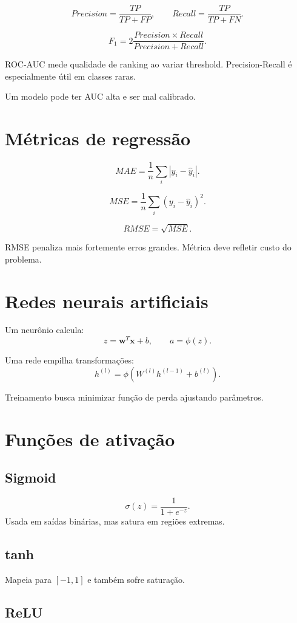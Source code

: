 \[
Precision=\frac{TP}{TP+FP},\qquad
Recall=\frac{TP}{TP+FN}.
\]

\[
F_1=2\frac{Precision\times Recall}{Precision+Recall}.
\]

ROC-AUC mede qualidade de ranking ao variar threshold. Precision-Recall é especialmente útil em classes raras.

Um modelo pode ter AUC alta e ser mal calibrado.

\section{Métricas de regressão}

\[
MAE=\frac{1}{n}\sum_i|y_i-\hat y_i|.
\]

\[
MSE=\frac{1}{n}\sum_i(y_i-\hat y_i)^2.
\]

\[
RMSE=\sqrt{MSE}.
\]

RMSE penaliza mais fortemente erros grandes. Métrica deve refletir custo do problema.

\section{Redes neurais artificiais}

Um neurônio calcula:
\[
z=\mathbf{w}^{T}\mathbf{x}+b,
\qquad
a=\phi(z).
\]

Uma rede empilha transformações:
\[
h^{(l)}=\phi(W^{(l)}h^{(l-1)}+b^{(l)}).
\]

Treinamento busca minimizar função de perda ajustando parâmetros.

\section{Funções de ativação}

\subsection{Sigmoid}

\[
\sigma(z)=\frac{1}{1+e^{-z}}.
\]
Usada em saídas binárias, mas satura em regiões extremas.

\subsection{tanh}

Mapeia para $[-1,1]$ e também sofre saturação.

\subsection{ReLU}

